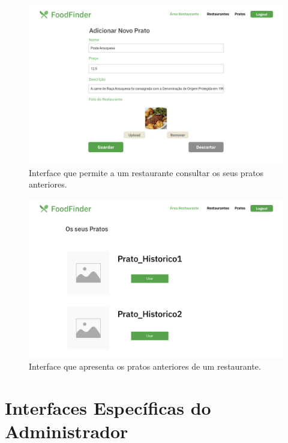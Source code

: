\documentclass[a4paper,12pt]{report}
\begin{document}
	\begin{figure}[H]
	\begin{center}
	\includegraphics[scale=0.25]{9.1-Pratos_Dia_Ativos_Editar_restaurante}	
	\end{center}
	\caption{Interface que permite a um restaurante consultar os seus pratos anteriores.}
	\end{figure}
	
	\begin{figure}[H]
	\begin{center}
	\includegraphics[scale=0.25]{10.1-Prato_Historico_restaurante}	
	\end{center}
	\caption{Interface que apresenta os pratos anteriores de um restaurante.}
	\end{figure} 
	
\section{Interfaces Específicas do Administrador}
	
\end{document}
